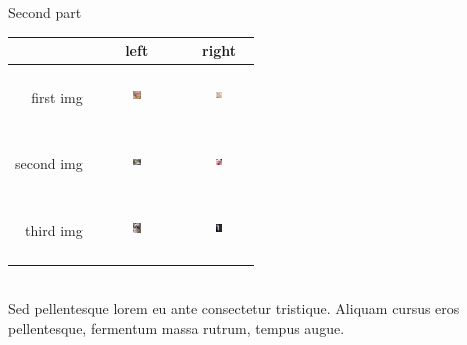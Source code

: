 \documentclass{beamer}
\begin{document}
\begin{frame}{Second part}
    \begin{tabular}{| r c | c |}
	\multicolumn{1}{r}{} &  \multicolumn{1}{c}{left} & \multicolumn{1}{c}{right} \\ \hline
	first img & \includegraphics[width=0.1\textwidth,height=15mm]{images/1.jpg} & \includegraphics[width=0.1\textwidth, height=15mm]{images/4.jpg} \\ \hline
	second img & \includegraphics[width=0.1\textwidth,height=15mm]{images/2.jpg} & \includegraphics[width=0.1\textwidth, height=15mm]{images/5.jpg} \\ \hline
	third img & \includegraphics[width=0.1\textwidth,height=15mm]{images/3.jpg} & \includegraphics[width=0.1\textwidth, height=15mm]{images/6.jpg} \\ \hline
\end{tabular} \\
    Sed pellentesque lorem eu ante consectetur tristique. Aliquam cursus eros pellentesque, fermentum massa rutrum, tempus augue.
\end{frame}
\end{document}
